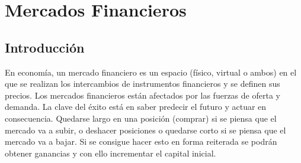 \chapter{Mercados Financieros}

\section{Introducción}
En economía, un mercado financiero es un espacio (físico, virtual o ambos) en el que se realizan los intercambios de instrumentos financieros y se definen sus precios. Los mercados financieros están afectados por las fuerzas de oferta y demanda. La clave del éxito está en saber predecir el futuro y actuar en consecuencia. Quedarse largo en una posición (comprar) si se piensa que el mercado va a subir, o deshacer posiciones o quedarse corto si se piensa que el mercado va a bajar. Si se consigue hacer esto en forma reiterada se podrán obtener ganancias y con ello incrementar el capital inicial.

